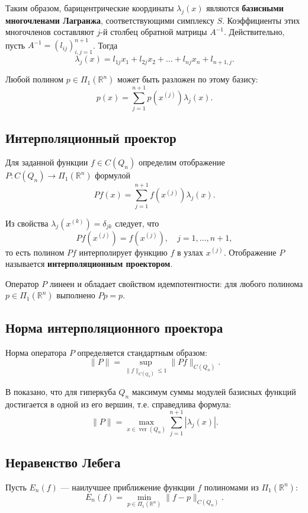 \documentclass[a4paper,12pt]{article}
\theoremstyle{indented}
\begin{document}
Таким образом, барицентрические координаты $\lambda_j(x)$ являются \textbf{базисными многочленами Лагранжа}, соответствующими симплексу $S$. Коэффициенты этих многочленов составляют $j$-й столбец обратной матрицы $A^{-1}$. Действительно, пусть $A^{-1} = (l_{ij})_{i,j=1}^{n+1}$. Тогда
\[
\lambda_j(x) = l_{1j} x_1 + l_{2j} x_2 + \dots + l_{nj} x_n + l_{n+1,j}.
\]

Любой полином $p \in \Pi_1(\mathbb{R}^n)$ может быть разложен по этому базису:
\[
p(x) = \sum_{j=1}^{n+1} p(x^{(j)}) \lambda_j(x). \tag{1}
\]

\subsection{Интерполяционный проектор}

Для заданной функции $f \in C(Q_n)$ определим отображение $P: C(Q_n) \to \Pi_1(\mathbb{R}^n)$ формулой
\[
P f(x) = \sum_{j=1}^{n+1} f(x^{(j)}) \lambda_j(x). \tag{2}
\]

Из свойства $\lambda_j(x^{(k)}) = \delta_{jk}$ следует, что
\[
P f(x^{(j)}) = f(x^{(j)}), \quad j = 1, \dots, n+1,
\]
то есть полином $P f$ интерполирует функцию $f$ в узлах $x^{(j)}$. Отображение $P$ называется \textbf{интерполяционным проектором}.

Оператор $P$ линеен и обладает свойством идемпотентности: для любого полинома $p \in \Pi_1(\mathbb{R}^n)$ выполнено $P p = p$.

\subsection{Норма интерполяционного проектора}

Норма оператора $P$ определяется стандартным образом:
\[
\|P\| = \sup_{\|f\|_{C(Q_n)} \le 1} \|P f\|_{C(Q_n)}.
\]

В \cite{nevsky_geo} показано, что для гиперкуба $Q_n$ максимум суммы модулей базисных функций достигается в одной из его вершин, т.е. справедлива формула:
\[
\|P\| = \max_{x \in \operatorname{ver}(Q_n)} \sum_{j=1}^{n+1} |\lambda_j(x)|. \tag{3}
\]

\subsection{Неравенство Лебега}

Пусть $E_n(f)$ — наилучшее приближение функции $f$ полиномами из $\Pi_1(\mathbb{R}^n)$:
\[
E_n(f) = \min_{p \in \Pi_1(\mathbb{R}^n)} \|f - p\|_{C(Q_n)}.
\]
\end{document}
